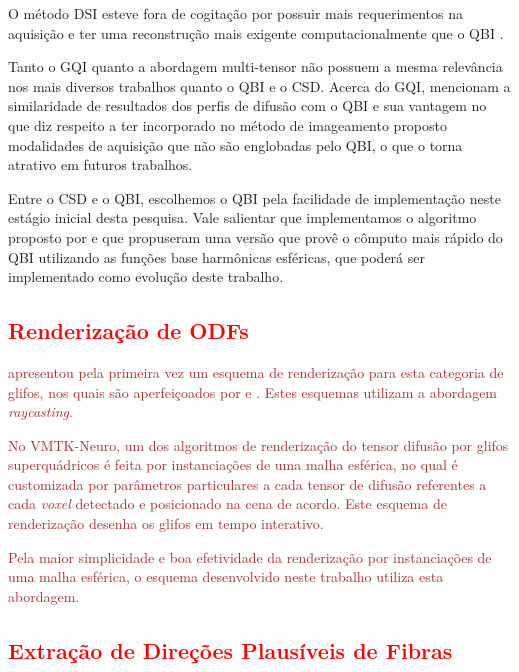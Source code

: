 \documentclass[
    12pt,                %
    oneside,            %
    a4paper,            %
    english,            %
    french,                %
    spanish,            %
    brazil                %
    ]{abntex2}
\begin{document}
O método DSI esteve fora de cogitação por possuir mais requerimentos na aquisição e ter uma reconstrução mais exigente computacionalmente que o QBI \cite{tournier2011}.

Tanto o GQI quanto a abordagem multi-tensor não possuem a mesma relevância nos mais diversos trabalhos quanto o QBI e o CSD. Acerca do GQI,  mencionam a similaridade de resultados dos perfis de difusão com o QBI e sua vantagem no que diz respeito a ter incorporado no método de imageamento proposto modalidades de aquisição que não são englobadas pelo QBI, o que o torna atrativo em futuros trabalhos.

Entre o CSD e o QBI, escolhemos o QBI pela facilidade de implementação neste estágio inicial desta pesquisa. Vale salientar que implementamos o algoritmo proposto por  e que  propuseram uma versão que provê o cômputo mais rápido do QBI utilizando as funções base harmônicas esféricas, que poderá ser implementado como evolução deste trabalho.

\textcolor{red}{\section{Renderização de ODFs}}

\textcolor{brown}{ apresentou pela primeira vez um esquema de renderização para esta categoria de glifos, nos quais são aperfeiçoados por  e . Estes esquemas utilizam a abordagem \textit{raycasting}.}

\textcolor{brown}{No VMTK-Neuro, um dos algoritmos de renderização do tensor difusão por glifos superquádricos é feita por instanciações de uma malha esférica, no qual é customizada por parâmetros particulares a cada tensor de difusão referentes a cada \textit{voxel} detectado e posicionado na cena de acordo. Este esquema de renderização desenha os glifos em tempo interativo.}


\textcolor{brown}{Pela maior simplicidade e boa efetividade da renderização por instanciações de uma malha esférica, o esquema desenvolvido neste trabalho utiliza esta abordagem.}

\textcolor{red}{\section{Extração de Direções Plausíveis de Fibras}}
\end{document}
